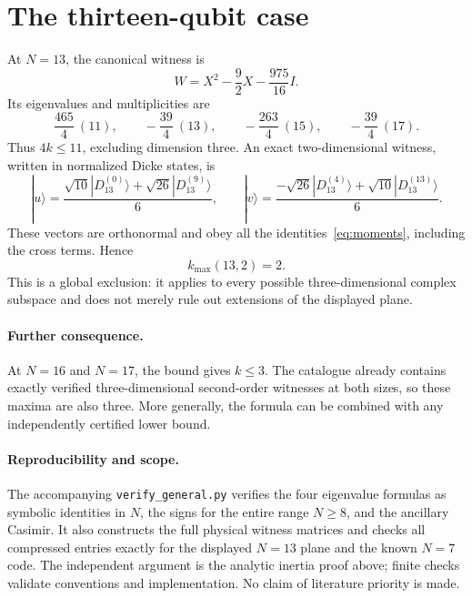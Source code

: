\documentclass[11pt]{article}
\begin{document}
\section{The thirteen-qubit case}
At $N=13$, the canonical witness is
\[
W=X^2-\frac92X-\frac{975}{16}I.
\]
Its eigenvalues and multiplicities are
\[
\frac{465}{4}\ (11),\qquad-\frac{39}{4}\ (13),\qquad
-\frac{263}{4}\ (15),\qquad-\frac{39}{4}\ (17).
\]
Thus $4k\le11$, excluding dimension three. An exact two-dimensional witness, written in normalized Dicke states, is
\[
|u\rangle=\frac{\sqrt{10}|D_{13}^{(0)}\rangle+\sqrt{26}|D_{13}^{(9)}\rangle}{6},
\qquad
|v\rangle=\frac{-\sqrt{26}|D_{13}^{(4)}\rangle+\sqrt{10}|D_{13}^{(13)}\rangle}{6}.
\]
These vectors are orthonormal and obey all the identities~\eqref{eq:moments}, including the cross terms. Hence
\[
\boxed{k_{\max}(13,2)=2.}
\]
This is a global exclusion: it applies to every possible three-dimensional complex subspace and does not merely rule out extensions of the displayed plane.

\paragraph{Further consequence.}
At $N=16$ and $N=17$, the bound gives $k\le3$. The catalogue already contains exactly verified three-dimensional second-order witnesses at both sizes, so these maxima are also three. More generally, the formula can be combined with any independently certified lower bound.

\paragraph{Reproducibility and scope.}
The accompanying \texttt{verify\_general.py} verifies the four eigenvalue formulas as symbolic identities in $N$, the signs for the entire range $N\ge8$, and the ancillary Casimir. It also constructs the full physical witness matrices and checks all compressed entries exactly for the displayed $N=13$ plane and the known $N=7$ code. The independent argument is the analytic inertia proof above; finite checks validate conventions and implementation. No claim of literature priority is made.
\end{document}
